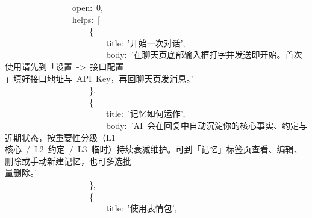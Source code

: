 \documentclass[a4paper,10pt]{article}
\begin{document}
{~~~~~~~~~~~~~~~~open:~0,\\
~~~~~~~~~~~~~~~~helps:~[\\
~~~~~~~~~~~~~~~~~~~~\{\\
~~~~~~~~~~~~~~~~~~~~~~~~title:~'开始一次对话',\\
~~~~~~~~~~~~~~~~~~~~~~~~body:~'在聊天页底部输入框打字并发送即开始。首次使用请先到「设置~->~接口配置\\
」填好接口地址与~API~Key，再回聊天页发消息。'\\
~~~~~~~~~~~~~~~~~~~~\},\\
~~~~~~~~~~~~~~~~~~~~\{\\
~~~~~~~~~~~~~~~~~~~~~~~~title:~'记忆如何运作',\\
~~~~~~~~~~~~~~~~~~~~~~~~body:~'AI~会在回复中自动沉淀你的核心事实、约定与近期状态，按重要性分级（L1~\\
核心~/~L2~约定~/~L3~临时）持续衰减维护。可到「记忆」标签页查看、编辑、删除或手动新建记忆，也可多选批\\
量删除。'\\
~~~~~~~~~~~~~~~~~~~~\},\\
~~~~~~~~~~~~~~~~~~~~\{\\
~~~~~~~~~~~~~~~~~~~~~~~~title:~'使用表情包',
}

\newpage
\end{document}
